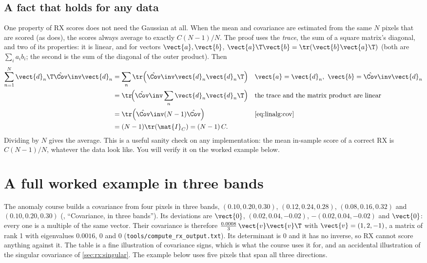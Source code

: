 \subsection{A fact that holds for any data}

One property of RX scores does not need the Gaussian at all. When the mean and covariance are
estimated from the same $N$ pixels that are scored (as  does), the scores always
average to exactly $C(N-1)/N$. The proof uses the \emph{trace}, the sum of a square
matrix's diagonal, and two of its properties: it is linear, and for vectors $\vect{a}, \vect{b}$,
$\vect{a}\T\vect{b} = \tr(\vect{b}\vect{a}\T)$ (both are $\sum_i a_ib_i$; the second is the sum of the
diagonal of the outer product). Then
\begin{align*}
\sum_{n=1}^{N}\vect{d}_n\T\hat\Cov\inv\vect{d}_n
&= \sum_n\tr\!\left(\hat\Cov\inv\vect{d}_n\vect{d}_n\T\right)
  && \vect{a} = \vect{d}_n,\ \vect{b} = \hat\Cov\inv\vect{d}_n\\
&= \tr\!\Big(\hat\Cov\inv\sum_n\vect{d}_n\vect{d}_n\T\Big)
  && \text{the trace and the matrix product are linear}\\
&= \tr\!\left(\hat\Cov\inv(N - 1)\hat\Cov\right)
  && \text{\cref{eq:linalg:cov}}\\
&= (N - 1)\tr(\mat{I}_C) = (N - 1)\,C .
\end{align*}
Dividing by $N$ gives the average. This is a useful sanity check on any implementation: the mean
in-sample score of a correct RX is $C(N-1)/N$, whatever the data look like. You will verify it on
the worked example below.

\section{A full worked example in three bands}\label{sec:rx:worked3}

\begin{sourcenote}
The anomaly course builds a covariance from four pixels in three bands, $(0.10, 0.20, 0.30)$,
$(0.12, 0.24, 0.28)$, $(0.08, 0.16, 0.32)$ and $(0.10, 0.20, 0.30)$
(, ``Covariance, in three bands''). Its
deviations are $\vect{0}$, $(0.02, 0.04, -0.02)$, $-(0.02, 0.04, -0.02)$ and $\vect{0}$: every one is a
multiple of the same vector. Their covariance is therefore $\frac{0.0008}{3}\,\vect{v}\vect{v}\T$
with $\vect{v} = (1, 2, -1)$, a matrix of rank 1 with eigenvalues $0.0016$, $0$ and $0$
(\texttt{tools/compute\_rx\_output.txt}). Its determinant is 0 and it has no inverse, so RX cannot
score anything against it. The table is a fine illustration of covariance signs, which is what the
course uses it for, and an accidental illustration of the singular covariance of
\cref{sec:rx:singular}. The example below uses five pixels that span all three directions.
\end{sourcenote}

